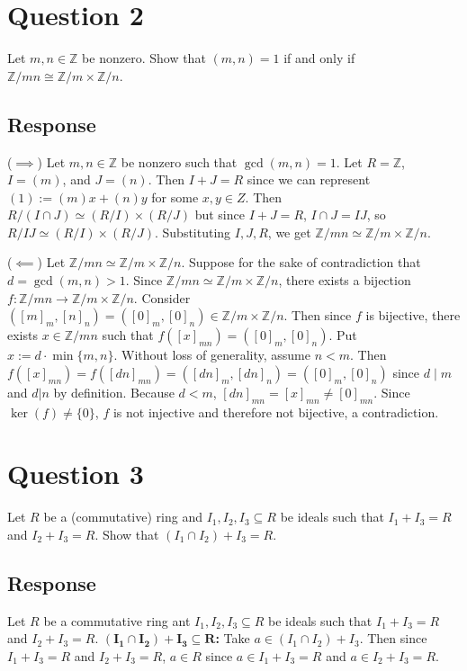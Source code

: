 \documentclass [12pt] {article}
\newcommand{\Z}{\mathbb{Z}}
\renewcommand{\bf}[1]{\textbf{{#1}}}
\begin{document}
\newpage
\section*{Question 2}
Let $m,n\in\Z$ be nonzero. Show that $(m,n)=1$ if and only if $\Z/mn\cong \Z/m \times \Z/n$.

\subsection*{Response}
($\implies$) Let $m, n \in \Z$ be nonzero such that $\gcd(m, n) = 1$. Let $R = \Z$, $I = (m)$, and 
$J = (n)$. Then $I + J = R$ since we can represent $(1) := (m)x + (n)y$ for some $x, y \in Z$. Then
$R/(I \cap J) \simeq (R/I) \times (R/J)$ but since $I + J = R$, $I \cap J = IJ$, so
$R/IJ \simeq (R/I) \times (R/J)$. Substituting $I, J, R$, we get
$\Z/mn \simeq \Z/m \times \Z/n$.
\vspace{0.5em}

($\impliedby$) Let $\Z/mn \simeq \Z/m \times \Z/n$. Suppose for the sake of
contradiction that $d = \gcd(m, n) > 1$. Since $\Z/mn \simeq \Z/m \times \Z/n$, there exists a
bijection $f : \Z/mn \to \Z/m \times \Z/n$. Consider 
$([m]_m, [n]_n) = ([0]_m, [0]_n) \in \Z/m \times \Z/n$. Then since $f$ is bijective, there exists 
$x \in \Z/mn$ such that $f([x]_{mn}) = ([0]_m, [0]_n)$. Put $x := d \cdot \min\{ m, n \}$. 
Without loss of generality, assume $n < m$. Then 
$f([x]_{mn}) = f([dn]_{mn}) = ([dn]_m, [dn]_n) = ([0]_m, [0]_n)$ since $d \mid m$ and $d | n$ by 
definition. Because $d < m$, $[dn]_{mn} = [x]_{mn} \neq [0]_{mn}$. Since
$\ker(f) \neq \{ 0 \}$, $f$ is not injective and therefore not bijective, a contradiction.



\newpage
\section*{Question 3}
Let $R$ be a (commutative) ring and  $I_1,I_2,I_3\subseteq R$ be ideals such that $I_1+I_3=R$ and
$I_2+I_3=R$. Show that $(I_1\cap I_2)+I_3=R$. 

\subsection*{Response}
Let $R$ be a commutative ring ant $I_1, I_2, I_3 \subseteq R$ be ideals such that $I_1 + I_3 = R$
and $I_2 + I_3 = R$. 
\bf{$\bm{(I_1 \cap I_2) + I_3 \subseteq R}$:}
Take $a \in (I_1 \cap I_2) + I_3$. Then since $I_1 + I_3 = R$ and $I_2 + I_3 = R$, $a \in R$ since
$a \in I_1 + I_3 = R$ and $a \in I_2 + I_3 = R$.
\vspace{1em}
\end{document}

